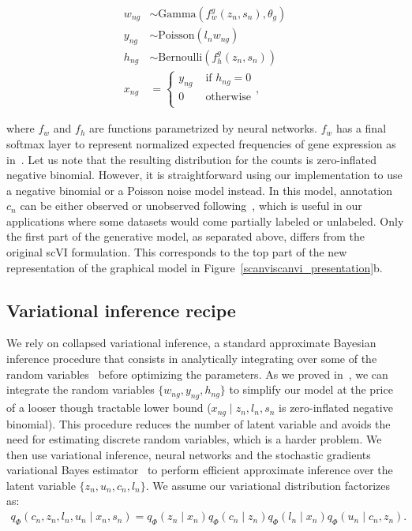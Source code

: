 \begin{align}
w_{ng} &\sim \mathrm{Gamma}(f^g_w(z_n, s_n), \theta_g)\\
y_{ng} &\sim \mathrm{Poisson}(l_nw_{ng})\\
h_{ng} &\sim \mathrm{Bernoulli}(f^g_h(z_n, s_n))\\
x_{ng} &=
\begin{cases}
y_{ng} & \text{ if } h_{ng} = 0\\
0 & \text{ otherwise}\\
\end{cases},
\end{align}

where $f_w$ and $f_h$ are functions parametrized by neural networks. $f_w$ has a final softmax layer to represent normalized expected frequencies of gene expression as in~\cite{scvi}. Let us note that the resulting distribution for the counts is zero-inflated negative binomial. However, it is straightforward using our implementation to use a negative binomial or a Poisson noise model instead. In this model, annotation $c_n$ can be either observed or unobserved following~\cite{VFAE, m1m2}, which is useful in our applications where some datasets would come partially labeled or unlabeled. Only the first part of the generative model, as separated above, differs from the original scVI formulation. This corresponds to the top part of the new representation of the graphical model in Figure~\ref{scanviscanvi_presentation}b. 



\subsection{Variational inference recipe}

We rely on collapsed variational inference, a standard approximate Bayesian inference procedure that consists in analytically integrating over some of the random variables~\cite{NIPS2006_3113} before optimizing the parameters. As we proved in~\cite{scvi}, we can integrate the random variables $\{ w_{ng}, y_{ng}, h_{ng} \}$ to simplify our model at the price of a looser though tractable lower bound ($x_{ng} \mid z_n, l_n, s_n$ is zero-inflated negative binomial). This procedure reduces the number of latent variable and avoids the need for estimating discrete random variables, which is a harder problem. We then use variational inference, neural networks and the stochastic gradients variational Bayes estimator~\cite{aevb} to perform efficient approximate inference over the latent variable $\{ z_n, u_n, c_n, l_n\}$. We assume our variational distribution factorizes as:
\begin{align}
q_\Phi(c_n, z_n, l_n, u_n \mid x_n, s_n) = q_\Phi(z_n \mid x_n)q_\Phi(c_n \mid z_n)q_\Phi(l_n \mid x_n)q_\Phi(u_n \mid c_n, z_n).
\end{align}

